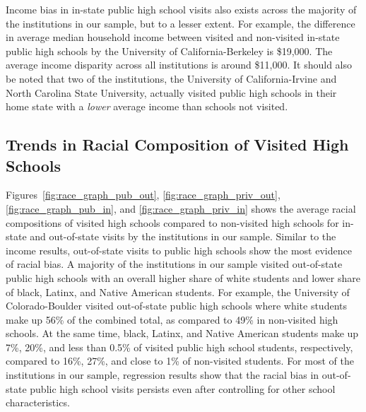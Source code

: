 \documentclass{article}
\begin{document}
Income bias in in-state public high school visits also exists across the majority of the institutions in our sample, but to a lesser extent. For example, the difference in average median household income between visited and non-visited in-state public high schools by the University of California-Berkeley is \$19,000. The average income disparity across all institutions is around \$11,000. It should also be noted that two of the institutions, the University of California-Irvine and North Carolina State University, actually visited public high schools in their home state with a \textit{lower} average income than schools not visited.

\subsection*{Trends in Racial Composition of Visited High Schools}

Figures~\ref{fig:race_graph_pub_out}, \ref{fig:race_graph_priv_out}, \ref{fig:race_graph_pub_in}, and \ref{fig:race_graph_priv_in} shows the average racial compositions of visited high schools compared to non-visited high schools for in-state and out-of-state visits by the institutions in our sample. Similar to the income results, out-of-state visits to public high schools show the most evidence of racial bias. A majority of the institutions in our sample visited out-of-state public high schools with an overall higher share of white students and lower share of black, Latinx, and Native American students. For example, the University of Colorado-Boulder visited out-of-state public high schools where white students make up 56\% of the combined total, as compared to 49\% in non-visited high schools. At the same time, black, Latinx, and Native American students make up 7\%, 20\%, and less than 0.5\% of visited public high school students, respectively, compared to 16\%, 27\%, and close to 1\% of non-visited students. For most of the institutions in our sample, regression results show that the racial bias in out-of-state public high school visits persists even after controlling for other school characteristics.
\end{document}
